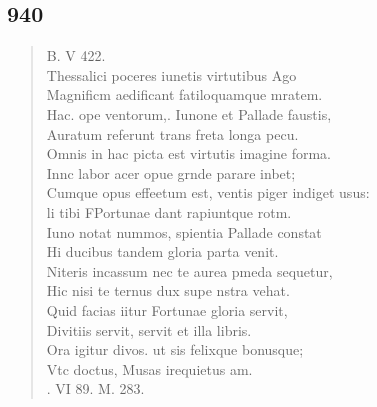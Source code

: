 \documentclass[11pt, a4paper]{report}
\begin{document}
            \subsection*{940}
      \begin{verse}
      B. V 422. \\ Thessalici poceres iunetis virtutibus Ago \\ Magnificm aedificant fatiloquamque mratem. \\ Hac. ope ventorum,. Iunone et Pallade faustis, \\ Auratum referunt trans freta longa pecu. \\ Omnis in hac picta est virtutis imagine forma. \\ Innc labor acer opue grnde parare inbet; \\ Cumque opus effeetum est, ventis piger indiget usus: \\ li tibi FPortunae dant rapiuntque rotm. \\ Iuno notat nummos, spientia Pallade constat \\ Hi ducibus tandem gloria parta venit. \\ Niteris incassum nec te aurea pmeda sequetur, \\ Hic nisi te ternus dux supe nstra vehat. \\ Quid facias iitur Fortunae gloria servit, \\ Divitiis servit, servit et illa libris. \\ Ora igitur divos. ut sis felixque bonusque; \\ Vtc doctus, Musas irequietus am. \\ . VI 89. M. 283. \\ 
      \end{verse}
  
\end{document}
